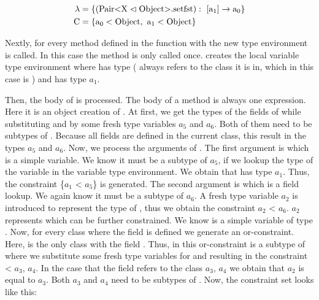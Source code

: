 \begin{align*}
    \lambda &= \{ ( \text{Pair} \text{<} \text{X} \vartriangleleft \text{Object} \text{>}. \text{setfst} ): \ [\text{a}_1] \to \text{a}_0 \}\\
    \text{C} &= \{ \text{a}_0 < \text{Object}, \ \text{a}_1 < \text{Object} \}\\
\end{align*}

Nextly, for every method defined in  the function  with the new type environment is called.
In this case the method  is only called once.  creates the local variable type environment where  has type  ( always refers to the class it is in, which in this case is ) and  has type $a_1$.

Then, the body of  is processed. The body of a method is always one expression. Here it is an object creation of .
At first, we get the types of the fields of  while substituting  and  by some fresh type variables $a_5$ and $a_6$. Both of them need to be subtypes of . Because all fields are defined in the current class, this result in the types $a_5$ and $a_6$. Now, we process the arguments of .
The first argument is  which is a simple variable. We know it must be a subtype of $a_5$, if we lookup the type of the variable  in the variable type environment. We obtain that  has type $a_1$. Thus, the constraint \{$a_1$ < $a_5$\} is generated.
The second argument is  which is a field lookup. We again know it must be a subtype of $a_6$. A fresh type variable $a_2$ is introduced to represent the type of , thus we obtain the constraint $a_2$ < $a_6$.
$a_2$ represents  which can be further constrained. We know  is a simple variable of type .
Now, for every class where the field  is defined we generate an or-constraint. Here,  is the only class with the field . Thus, in this or-constraint  is a subtype of  where we substitute some fresh type variables for  and  resulting in the constraint  < $a_3$, $a_4$\inl{>}.
In the case that the field  refers to the class $a_3$, $a_4$\inl{>} we obtain that $a_2$ is equal to $a_3$. Both $a_3$ and $a_4$ need to be subtypes of .
Now, the constraint set looks like this:

